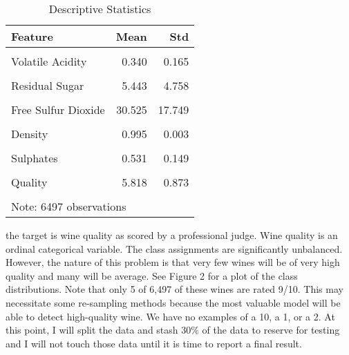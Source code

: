 \documentclass[16pt,twocolumn,letterpaper,titlepage]{article}
\begin{document}
\begin{table}[!h]

\caption{Descriptive Statistics}
\centering
\begin{tabular}[t]{lrr}
\toprule
Feature & Mean & Std\\
\midrule
\cellcolor{gray!6}{Fixed Acidity} & \cellcolor{gray!6}{7.215} & \cellcolor{gray!6}{1.296}\\
Volatile Acidity & 0.340 & 0.165\\
\cellcolor{gray!6}{Citric Acid} & \cellcolor{gray!6}{0.319} & \cellcolor{gray!6}{0.145}\\
Residual Sugar & 5.443 & 4.758\\
\cellcolor{gray!6}{Chlorides} & \cellcolor{gray!6}{0.056} & \cellcolor{gray!6}{0.035}\\
\addlinespace
Free Sulfur Dioxide & 30.525 & 17.749\\
\cellcolor{gray!6}{Total Sulfur Dioxide} & \cellcolor{gray!6}{115.745} & \cellcolor{gray!6}{56.522}\\
Density & 0.995 & 0.003\\
\cellcolor{gray!6}{Ph} & \cellcolor{gray!6}{3.219} & \cellcolor{gray!6}{0.161}\\
Sulphates & 0.531 & 0.149\\
\addlinespace
\cellcolor{gray!6}{Alcohol} & \cellcolor{gray!6}{10.492} & \cellcolor{gray!6}{1.193}\\
Quality & 5.818 & 0.873\\
\cellcolor{gray!6}{Is Red} & \cellcolor{gray!6}{0.246} & \cellcolor{gray!6}{0.431}\\
\bottomrule
\multicolumn{3}{l}{Note: 6497 observations}\\
\end{tabular}
\end{table}



the target is wine quality as scored by a professional judge. Wine quality is an ordinal categorical variable. The class assignments are significantly unbalanced. However, the nature of this problem is that very few wines will be of very high quality and many will be average. See Figure 2 for a plot of the class distributions. Note that only 5 of 6,497 of these wines are rated 9/10. This may necessitate some re-sampling methods because the most valuable model will be able to detect high-quality wine. We have no examples of a 10, a 1, or a 2. At this point, I will split the data and stash 30\% of the data to reserve for testing and I will not touch those data until it is time to report a final result.
\end{document}
